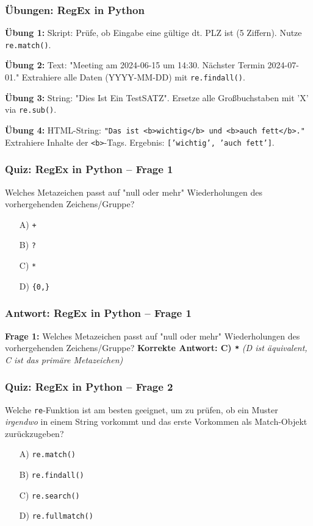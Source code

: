 \documentclass[aspectratio=169]{beamer} %
\begin{document}
\begin{frame}[fragile]
\frametitle{Übungen: RegEx in Python}
\textbf{Übung 1:}
Skript: Prüfe, ob Eingabe eine gültige dt. PLZ ist (5 Ziffern). Nutze \texttt{re.match()}.
\vspace{0.5em}

\textbf{Übung 2:}
Text: "Meeting am 2024-06-15 um 14:30. Nächster Termin 2024-07-01."
Extrahiere alle Daten (YYYY-MM-DD) mit \texttt{re.findall()}.
\vspace{0.5em}

\textbf{Übung 3:}
String: "Dies Ist Ein TestSATZ". Ersetze alle Großbuchstaben mit 'X' via \texttt{re.sub()}.
\vspace{0.5em}

\textbf{Übung 4:}
HTML-String: \texttt{"Das ist <b>wichtig</b> und <b>auch fett</b>."}
Extrahiere Inhalte der \texttt{<b>}-Tags. Ergebnis: \texttt{['wichtig', 'auch fett']}.
\end{frame}

\begin{frame}[fragile]
\frametitle{Quiz: RegEx in Python – Frage 1}
Welches Metazeichen passt auf "null oder mehr" Wiederholungen des vorhergehenden Zeichens/Gruppe?
\begin{enumerate}
    \item[A)] \texttt{+}
    \item[B)] \texttt{?}
    \item[C)] \texttt{*}
    \item[D)] \texttt{\{0,\}}
\end{enumerate}
\end{frame}

\begin{frame}[fragile]
\frametitle{Antwort: RegEx in Python – Frage 1}
\textbf{Frage 1:} Welches Metazeichen passt auf "null oder mehr" Wiederholungen des vorhergehenden Zeichens/Gruppe?
\vspace{1em}
\textbf{Korrekte Antwort: C) \texttt{*}} \textit{(D ist äquivalent, C ist das primäre Metazeichen)}
\end{frame}

\begin{frame}[fragile]
\frametitle{Quiz: RegEx in Python – Frage 2}
Welche \texttt{re}-Funktion ist am besten geeignet, um zu prüfen, ob ein Muster \textit{irgendwo} in einem String vorkommt und das erste Vorkommen als Match-Objekt zurückzugeben?
\begin{enumerate}
    \item[A)] \texttt{re.match()}
    \item[B)] \texttt{re.findall()}
    \item[C)] \texttt{re.search()}
    \item[D)] \texttt{re.fullmatch()}
\end{enumerate}
\end{frame}
\end{document}
